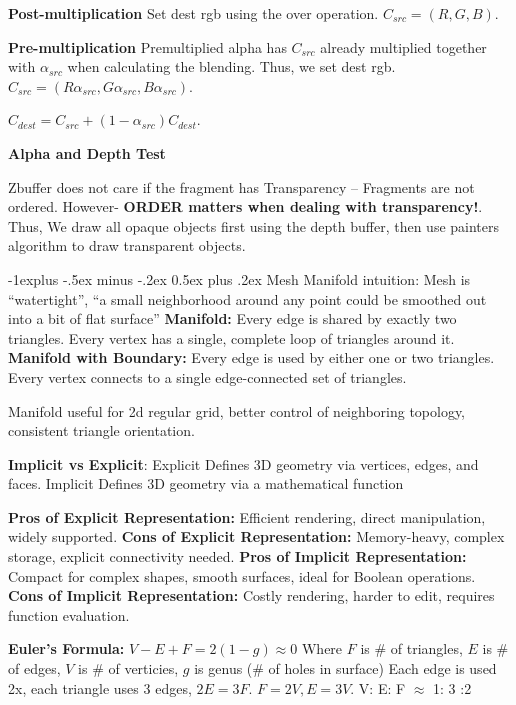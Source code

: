 \documentclass[letterpaper, 8pt]{extarticle}
\makeatletter
\renewcommand{\section}{\@startsection{section}{1}{0mm}%
                                {-1explus -.5ex minus -.2ex}%
                                {0.5ex plus .2ex}%
                                {\normalfont\small\bfseries}}
\makeatother
\begin{document}
\begin{multicols*}{4}
    \textbf{Post-multiplication}
    Set dest rgb using the over operation. $C_{src} = (R,G,B)$.

    \textbf{Pre-multiplication}
    Premultiplied alpha has $C_{src}$ already multiplied together with $\alpha_{src}$ when calculating the blending.
    Thus, we set dest rgb. $C_{src} = (R\alpha_{src},G\alpha_{src},B\alpha_{src})$.

    $C_{dest} = C_{src} + (1-\alpha_{src})C_{dest}$.

    \textbf{Alpha and Depth Test}

    Zbuffer does not care if the fragment has Transparency -- Fragments are not ordered. However- \textbf{ORDER matters when dealing with transparency!}.
    Thus, We draw all opaque objects first using the depth buffer, then use painters algorithm to draw transparent objects.

    \section{Mesh}
    Manifold intuition:
    Mesh is ``watertight'',
    ``a small neighborhood around any point could be smoothed out into a bit of flat surface''
    \textbf{Manifold:} Every edge is shared by exactly two triangles. Every vertex has a single, complete loop of triangles around it.
    \textbf{Manifold with Boundary:} Every edge is used by either one or two triangles. Every vertex connects to a single edge-connected set of triangles.

    Manifold useful for 2d regular grid,
    better control of neighboring topology,
    consistent triangle orientation.

    \textbf{Implicit vs Explicit}: Explicit Defines 3D geometry via vertices, edges, and faces. Implicit Defines 3D geometry via a mathematical function

    \textbf{Pros of Explicit Representation:} Efficient rendering, direct manipulation, widely supported.
    \textbf{Cons of Explicit Representation:} Memory-heavy, complex storage, explicit connectivity needed.
    \textbf{Pros of Implicit Representation:} Compact for complex shapes, smooth surfaces, ideal for Boolean operations.
    \textbf{Cons of Implicit Representation:} Costly rendering, harder to edit, requires function evaluation.

    \textbf{Euler's Formula:} $V - E + F = 2(1 - g) \approx 0$
    Where $F$ is \# of triangles,
    $E$ is \# of edges,
    $V$ is \# of verticies,
    $g$ is genus (\# of holes in surface)
    Each edge is used 2x, each triangle uses 3 edges, $2E = 3F$.
    $F = 2V, E = 3V$. V: E: F $\approx$ 1: 3 :2


\end{multicols*}
\end{document}
